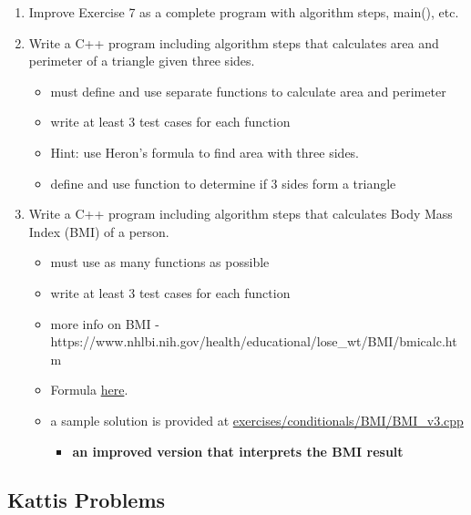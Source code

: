 \documentclass[11pt]{article}
\providecommand{\tightlist}{%
      \setlength{\itemsep}{0pt}\setlength{\parskip}{0pt}}
\begin{document}
    \begin{enumerate}
\def\labelenumi{\arabic{enumi}.}
\setcounter{enumi}{7}
\item
  Improve Exercise 7 as a complete program with algorithm steps, main(),
  etc.
\item
  Write a C++ program including algorithm steps that calculates area and
  perimeter of a triangle given three sides.

  \begin{itemize}
  \tightlist
  \item
    must define and use separate functions to calculate area and
    perimeter
  \item
    write at least 3 test cases for each function
  \item
    Hint: use Heron's formula to find area with three sides.
  \item
    define and use function to determine if 3 sides form a triangle
  \end{itemize}
\item
  Write a C++ program including algorithm steps that calculates Body
  Mass Index (BMI) of a person.

  \begin{itemize}
  \tightlist
  \item
    must use as many functions as possible
  \item
    write at least 3 test cases for each function
  \item
    more info on BMI -
    https://www.nhlbi.nih.gov/health/educational/lose\_wt/BMI/bmicalc.htm
  \item
    Formula
    \href{https://www.cdc.gov/healthyweight/assessing/bmi/childrens_bmi/childrens_bmi_formula.html\#:~:text=The\%20formula\%20for\%20BMI\%20is,to\%20convert\%20this\%20to\%20meters.\&text=When\%20using\%20English\%20measurements\%2C\%20pounds\%20should\%20be\%20divided\%20by\%20inches\%20squared}{here}.
  \item
    a sample solution is provided at
    \url{exercises/conditionals/BMI/BMI_v3.cpp}

    \begin{itemize}
    \tightlist
    \item
      \textbf{an improved version that interprets the BMI result}
    \end{itemize}
  \end{itemize}
\end{enumerate}

    \hypertarget{kattis-problems}{%
\subsection{Kattis Problems}\label{kattis-problems}}
\end{document}
